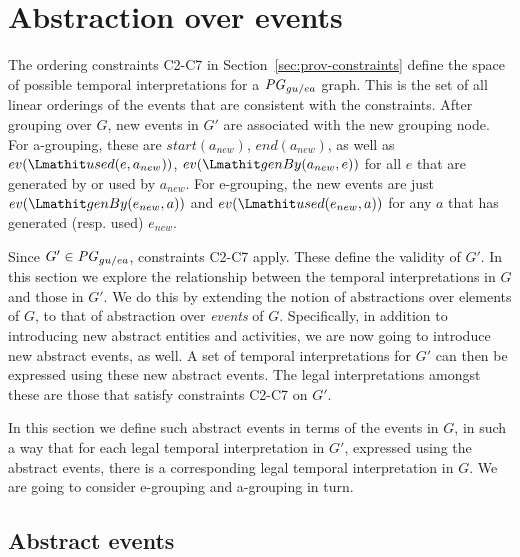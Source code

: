 
\section{Abstraction over events}
\label{sec:event}

The ordering constraints C2-C7 in Section~\ref{sec:prov-constraints} define the space of possible temporal interpretations for a $\mathit{PG}_{gu/ea}$ graph. This is the set of all linear orderings of the events that are consistent with the constraints. 
After grouping over $G$, new events in $G'$ are associated with the new grouping node. For a-grouping, these are
 $start(a_{new})$, $end(a_{new})$, as well as 
$ev(\used(e, a_{new}))$, $ev(\wgby(a_{new}, e))$ for all $e$ that are generated by or used by $a_{new}$. 
For e-grouping, the new events are just $ev(\wgby(e_{new}, a))$ and  $ev(\used(e_{new},a))$ for any $a$ that has generated (resp. used) $e_{new}$.

Since $G' \in \mathit{PG}_{gu/ea}$, constraints C2-C7 apply.
%
These define the validity of $G'$.
%
%
In this section we explore the relationship between the temporal interpretations in $G$ and those in $G'$. We do this by extending the notion of abstractions over elements of $G$, to that of abstraction over \textit{events} of $G$. 
%
Specifically, in addition to introducing new abstract entities and activities, we are now going to introduce new abstract events, as well. 
%
A set of temporal interpretations for $G'$ can then be expressed using these new abstract events. The legal interpretations amongst these are those that satisfy constraints C2-C7 on $G'$.
%

%
In this section we define such abstract events in terms of the events in $G$, in such a way that for each legal temporal interpretation in $G'$, expressed using the abstract events, there is a corresponding legal temporal interpretation in $G$.
%
We are going to consider e-grouping and a-grouping in turn.

\subsection{Abstract events}

